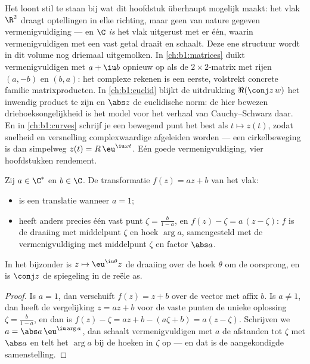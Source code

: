 \begin{remark}\label{rem:b1:complex:interlude}
Het loont stil te staan bij wat dit hoofdstuk überhaupt mogelijk
maakt: het vlak $\R^2$ draagt optellingen in elke richting, maar geen
van nature gegeven vermenigvuldiging --- en $\C$ \emph{is} het vlak
uitgerust met er één, waarin vermenigvuldigen met een vast getal
draait en schaalt. Deze ene structuur wordt in dit volume nog driemaal
uitgemolken. In \cref{ch:b1:matrices} duikt vermenigvuldigen met $a +
\iu b$ opnieuw op als de $2 \times 2$-matrix met rijen $(a, -b)$ en
$(b, a)$: het complexe rekenen is een eerste, volstrekt concrete
familie matrixproducten. In \cref{ch:b1:euclid} blijkt de uitdrukking
$\Re(\conj z\,w)$ het inwendig product te zijn en $\abs z$ de
euclidische norm: de hier bewezen driehoeksongelijkheid is het model
voor het verhaal van Cauchy--Schwarz daar. En in \cref{ch:b1:curves}
schrijf je een bewegend punt het best als $t \mapsto z(t)$, zodat
snelheid en versnelling complexwaardige afgeleiden worden --- een
cirkelbeweging is dan simpelweg $z(t) = R\,\eu^{\iu\omega t}$. Eén
goede vermenigvuldiging, vier hoofdstukken rendement.
\end{remark}

\begin{proposition}\label{prop:b1:complex:similitude}
Zij $a \in \C^*$ en $b \in \C$. De transformatie $f(z) = az + b$ van het
vlak:
\begin{itemize}
  \item is een translatie wanneer $a = 1$;
  \item heeft anders precies één vast punt $\zeta = \frac{b}{1-a}$, en
        $f(z) - \zeta = a\,(z - \zeta)$: $f$ is de draaiing met
        middelpunt $\zeta$ en hoek $\arg a$, samengesteld met de
        vermenigvuldiging met middelpunt $\zeta$ en factor $\abs a$.
\end{itemize}
In het bijzonder is $z \mapsto \eu^{\iu\theta} z$ de draaiing over de
hoek $\theta$ om de oorsprong, en is $\conj z$ de spiegeling in de reële
as.
\end{proposition}

\begin{proof}
Is $a = 1$, dan verschuift $f(z) = z + b$ over de vector met affix $b$.
Is $a \neq 1$, dan heeft de vergelijking $z = az + b$ voor de vaste
punten de unieke oplossing $\zeta = \frac{b}{1-a}$, en dan is $f(z) -
\zeta = az + b - (a\zeta + b) = a(z - \zeta)$. Schrijven we $a = \abs a\,
\eu^{\iu\arg a}$, dan schaalt vermenigvuldigen met $a$ de afstanden tot
$\zeta$ met $\abs a$ en telt het $\arg a$ bij de hoeken in $\zeta$ op ---
en dat is de aangekondigde samenstelling.
\end{proof}


